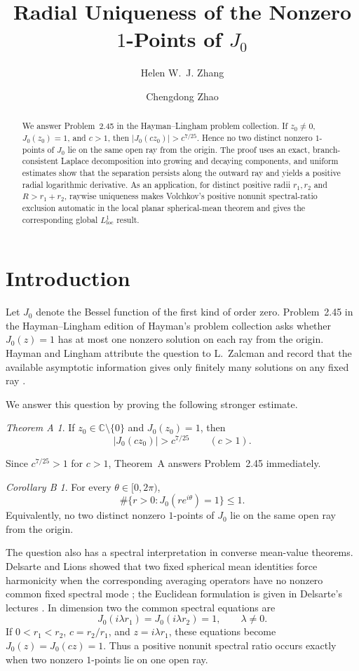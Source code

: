 \documentclass[11pt]{amsart}
\title[Radial uniqueness of the nonzero 1-points of $J_0$]
{Radial Uniqueness of the Nonzero \texorpdfstring{$1$}{1}-Points of \texorpdfstring{$J_0$}{J0}}
\author{Helen W.~J. Zhang}
\author{Chengdong Zhao}
\date{}
\numberwithin{equation}{section}
\theoremstyle{definition}
\theoremstyle{remark}
\newtheorem*{theoremA}{Theorem A}
\newtheorem*{corollaryB}{Corollary B}
\newcommand{\C}{\mathbb C}
\begin{document}
\begin{abstract}
We answer Problem~2.45 in the Hayman--Lingham problem collection.  If
$z_0\ne0$, $J_0(z_0)=1$, and $c>1$, then
$|J_0(cz_0)|>c^{7/25}$.  Hence no two distinct nonzero
$1$-points of $J_0$ lie on the same open ray from the origin.  The proof uses
an exact, branch-consistent Laplace decomposition into growing and decaying
components, and uniform estimates show that
the separation persists along the outward ray and yields a positive radial
logarithmic derivative.  As an application, for distinct positive radii
$r_1,r_2$ and $R>r_1+r_2$, raywise uniqueness makes Volchkov's positive nonunit
spectral-ratio exclusion automatic in the local planar spherical-mean
theorem and gives the corresponding global $L^1_{\mathrm{loc}}$ result.
\end{abstract}

\maketitle

\section{Introduction}

Let $J_0$ denote the Bessel function of the first kind of order zero.
Problem~2.45 in the Hayman--Lingham edition of Hayman's problem collection
asks whether $J_0(z)=1$ has at most one nonzero solution on each ray from
the origin.  Hayman and Lingham attribute the question to L.~Zalcman and
record that the available asymptotic information gives only finitely many
solutions on any fixed ray
\cite[Problem~2.45]{HaymanLingham2019}.

We answer this question by proving the following stronger estimate.

\begin{theoremA}
If $z_0\in\C\setminus\{0\}$ and $J_0(z_0)=1$, then
\[
   |J_0(cz_0)|>c^{7/25}\qquad(c>1).
\]
\end{theoremA}

Since $c^{7/25}>1$ for $c>1$, Theorem~A answers Problem~2.45 immediately.

\begin{corollaryB}
For every $\theta\in[0,2\pi)$,
\[
   \#\{r>0:J_0(re^{i\theta})=1\}\le1.
\]
Equivalently, no two distinct nonzero $1$-points of $J_0$ lie on the same
open ray from the origin.
\end{corollaryB}

The question also has a spectral interpretation in converse mean-value
theorems.  Delsarte and Lions showed that two fixed spherical mean
identities force harmonicity when the corresponding averaging operators
have no nonzero common fixed spectral mode \cite{DelsarteLions1959}; the
Euclidean formulation is given in Delsarte's lectures
\cite[Part~III, \S\S3--4]{Delsarte1961}.  In dimension two the common
spectral equations are
\[
   J_0(i\lambda r_1)=J_0(i\lambda r_2)=1,\qquad\lambda\ne0.
\]
If $0<r_1<r_2$, $c=r_2/r_1$, and $z=i\lambda r_1$, these equations become
$J_0(z)=J_0(cz)=1$.  Thus a positive nonunit spectral ratio occurs exactly
when two nonzero $1$-points lie on one open ray.
\end{document}
